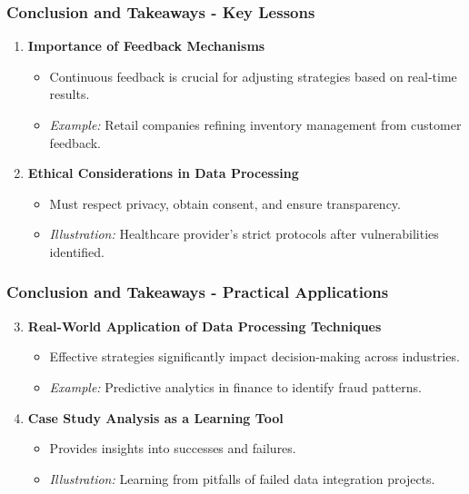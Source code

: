 \documentclass[aspectratio=169]{beamer}
\begin{document}
\begin{frame}[fragile]
    \frametitle{Conclusion and Takeaways - Key Lessons}
    \begin{enumerate}
        \item \textbf{Importance of Feedback Mechanisms}
        \begin{itemize}
            \item Continuous feedback is crucial for adjusting strategies based on real-time results.
            \item \textit{Example:} Retail companies refining inventory management from customer feedback.
        \end{itemize}
        
        \item \textbf{Ethical Considerations in Data Processing}
        \begin{itemize}
            \item Must respect privacy, obtain consent, and ensure transparency.
            \item \textit{Illustration:} Healthcare provider's strict protocols after vulnerabilities identified.
        \end{itemize}
    \end{enumerate}
\end{frame}

\begin{frame}[fragile]
    \frametitle{Conclusion and Takeaways - Practical Applications}
    \begin{enumerate}
        \setcounter{enumi}{2} %
        \item \textbf{Real-World Application of Data Processing Techniques}
        \begin{itemize}
            \item Effective strategies significantly impact decision-making across industries.
            \item \textit{Example:} Predictive analytics in finance to identify fraud patterns.
        \end{itemize}
        
        \item \textbf{Case Study Analysis as a Learning Tool}
        \begin{itemize}
            \item Provides insights into successes and failures.
            \item \textit{Illustration:} Learning from pitfalls of failed data integration projects.
        \end{itemize}
    \end{enumerate}
\end{frame}
\end{document}
